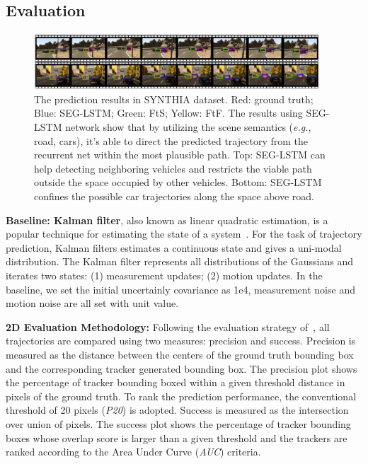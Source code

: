 \documentclass[10pt,twocolumn,letterpaper]{article}
\begin{document}
\subsection{Evaluation}

\begin{figure}[t]
        \centering
        \includegraphics[width=0.95\textwidth]{figures/prediction.pdf}
        \caption{
        \small{The prediction results in SYNTHIA dataset. {\color{red}Red: ground truth}; {\color{blue}Blue: SEG-LSTM}; {\color{green}Green: FtS}; {\color{yellow}Yellow: FtF}.
        The results using SEG-LSTM network show that by utilizing the scene semantics (\emph{e.g.}, road, cars), it's able to direct the predicted trajectory from the recurrent net within the most plausible path. Top: SEG-LSTM can help detecting neighboring vehicles and restricts the viable path outside the space occupied by other vehicles. Bottom:  SEG-LSTM confines the possible car trajectories along the space above road.}
                }
        \label{fig:final}
\end{figure}

\vspace{\baselineskip}
\noindent \textbf{Baseline: Kalman filter}, also known as linear quadratic estimation, is a popular technique for estimating the state of a system~\cite{Thrun2016}. For the task of trajectory prediction, Kalman filters estimates a continuous state and gives a uni-modal distribution. The Kalman filter represents all distributions of the Gaussians and iterates two states: (1) measurement updates; (2) motion updates. In the baseline, we set
the initial uncertainly covariance as 1e4, measurement noise and motion noise are all set with unit value.


\noindent \textbf{2D Evaluation Methodology:}
Following the evaluation strategy  of~\cite{wu2013online}, all trajectories are compared using two measures: precision and success. Precision is measured as the distance between the centers of the ground truth bounding box and the corresponding tracker generated bounding box. The precision plot shows the percentage of tracker bounding boxed within a given threshold distance in pixels of the ground truth. To rank the prediction performance, the conventional threshold of 20 pixels (\emph{P20}) is adopted. Success is measured as the intersection over union of pixels. The success plot shows the percentage of tracker bounding boxes whose overlap score is larger than a given threshold and the trackers are ranked according to the Area Under Curve (\emph{AUC}) criteria.
\end{document}
